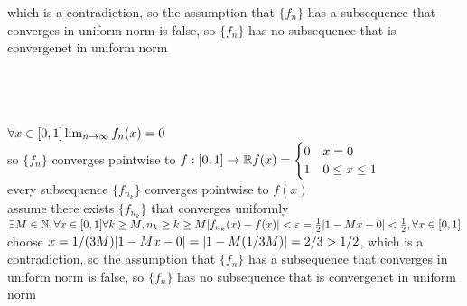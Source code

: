 \documentclass[12pt, border = 4pt, multi]{article} %
\begin{document}
which is a contradiction, so the assumption that $\{f_n\}$ has a subsequence that converges in uniform norm is false, so $\{f_n\}$ has no subsequence that is convergenet in uniform norm\\
\\
\\
\\
\\
$\forall x \in [0, 1]\\
\lim_{n \rightarrow \infty} f_n(x) = 0$\\
so $\{f_n\}$ converges pointwise to $f: [0, 1] \rightarrow \mathbb{R}\\
f(x) =
\begin{cases}
0 & x = 0\\
1 & 0 \leq x \leq 1\\
\end{cases}$\\
every subsequence $\{f_{n_k}\}$ converges pointwise to $f(x)$\\
assume there exists $\{f_{n_k}\}$ that converges uniformly\\
$\exists M \in \mathbb{N}, \forall x \in [0, 1]\\
\forall k \geq M, n_k \geq k \geq M\\
|f_{n_k}(x) - f(x)| < \varepsilon = \frac{1}{2}\\
|1 - Mx - 0| < \frac{1}{2}, \forall x \in [0, 1]$\\
choose $x = 1 / (3M)\\
|1 - Mx - 0| = |1 - M(1 / 3M)| = 2 / 3 > 1 / 2$, which is a contradiction, so the assumption that $\{f_n\}$ has a subsequence that converges in uniform norm is false, so $\{f_n\}$ has no subsequence that is convergenet in uniform norm\\
\end{document}

